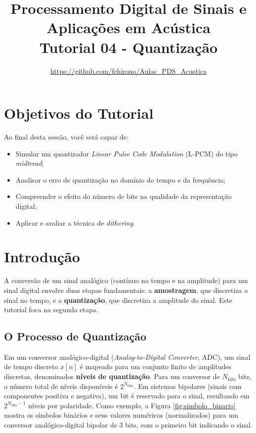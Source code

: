 \documentclass[a4paper,twoside,12pt]{article}
\title{\vspace{-2cm} Processamento Digital de Sinais e Aplicações em Acústica\\ Tutorial 04 - Quantização}
\author{\url{https://github.com/fchirono/Aulas_PDS_Acustica}}
\begin{document}
	\date{}
	\maketitle
	
	\section*{Objetivos do Tutorial}
	Ao final desta sessão, você será capaz de:
		\begin{itemize}
		\item Simular um quantizador \emph{Linear Pulse Code Modulation} (L-PCM) do tipo \textit{midtread};
		\item Analisar o erro de quantização no domínio do tempo e da frequência;
		\item Compreender o efeito do número de bits na qualidade da representação
		digital;
		\item Aplicar e avaliar a técnica de \textit{dithering}.
	\end{itemize}

	\begingroup
	\let\clearpage\relax
	\tableofcontents
	\endgroup
	
	
	\section{Introdução}
	
	A conversão de um sinal analógico (contínuo no tempo e na amplitude) para um sinal digital envolve duas etapas fundamentais: a \textbf{amostragem}, que discretiza o sinal no tempo, e a \textbf{quantização}, que discretiza a amplitude do sinal. Este tutorial foca na segunda etapa.
	
	\subsection{O Processo de Quantização}
	
	Em um conversor analógico-digital (\textit{Analog-to-Digital Converter}, ADC), um sinal de tempo discreto $x[n]$ é mapeado para um conjunto finito de amplitudes discretas, denominados \textbf{níveis de quantização}. Para um conversor de $N_\text{bits}$ bits, o número total de níveis disponíveis é $2^{N_\text{bits}}$. Em sistemas bipolares (sinais com componentes positiva e negativa), um bit é reservado para o sinal, resultando em $2^{N_\text{bits}-1}$ níveis por polaridade. Como exemplo, a Figura \ref{fig:simbolo_binario} mostra os símbolos binários e seus valores numéricos (normalizados) para um conversor analógico-digital bipolar de 3 bits, com o primeiro bit indicando o sinal.
	
\end{document}
